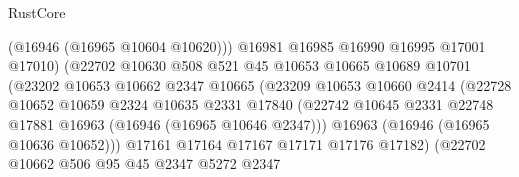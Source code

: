 \begin{lexlean}{RustCore}
\begin{coremodule}
                                      (@16946 (@16965 @10604 @10620)))
                                    @16981
                                    @16985
                                    @16990
                                    @16995
                                    @17001
                                    @17010)
                                  (@22702
                                    @10630
                                    @508
                                    @521
                                    @45
                                    @10653
                                    @10665
                                    @10689
                                    @10701
                                    (@23202
                                      @10653
                                      @10662
                                      @2347
                                      @10665
                                      (@23209
                                        @10653
                                        @10660
                                        @2414
                                        (@22728
                                          @10652
                                          @10659
                                          @2324
                                          @10635
                                          @2331
                                          @17840
                                          (@22742
                                            @10645
                                            @2331
                                            @22748
                                            @17881
                                            @16963
                                            (@16946 (@16965 @10646 @2347)))
                                          @16963
                                          (@16946 (@16965 @10636 @10652)))
                                        @17161
                                        @17164
                                        @17167
                                        @17171
                                        @17176
                                        @17182)
                                      (@22702
                                        @10662
                                        @506
                                        @95
                                        @45
                                        @2347
                                        @5272
                                        @2347

\end{coremodule}
\end{lexlean}
